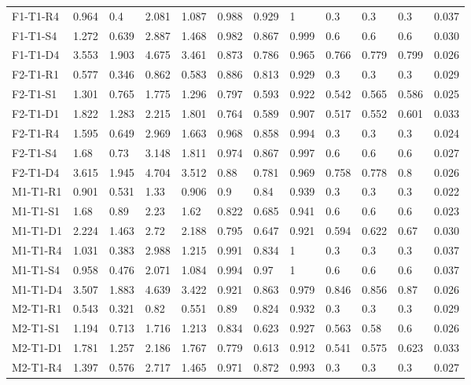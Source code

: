 \begin{table}[ht]
\begin{tabular}{llllllllllll}
  F1-T1-R4 & 0.964 & 0.4 & 2.081 & 1.087 & 0.988 & 0.929 & 1 & 0.3 & 0.3 & 0.3 &    0.037  \\ 
  F1-T1-S4 & 1.272 & 0.639 & 2.887 & 1.468 & 0.982 & 0.867 & 0.999 & 0.6 & 0.6 & 0.6 &    0.030  \\ 
  F1-T1-D4 & 3.553 & 1.903 & 4.675 & 3.461 & 0.873 & 0.786 & 0.965 & 0.766 & 0.779 & 0.799 &    0.026  \\ 
  F2-T1-R1 & 0.577 & 0.346 & 0.862 & 0.583 & 0.886 & 0.813 & 0.929 & 0.3 & 0.3 & 0.3 &    0.029  \\ 
  F2-T1-S1 & 1.301 & 0.765 & 1.775 & 1.296 & 0.797 & 0.593 & 0.922 & 0.542 & 0.565 & 0.586 &    0.025  \\ 
  F2-T1-D1 & 1.822 & 1.283 & 2.215 & 1.801 & 0.764 & 0.589 & 0.907 & 0.517 & 0.552 & 0.601 &    0.033  \\ 
  F2-T1-R4 & 1.595 & 0.649 & 2.969 & 1.663 & 0.968 & 0.858 & 0.994 & 0.3 & 0.3 & 0.3 &    0.024  \\ 
  F2-T1-S4 & 1.68 & 0.73 & 3.148 & 1.811 & 0.974 & 0.867 & 0.997 & 0.6 & 0.6 & 0.6 &    0.027  \\ 
  F2-T1-D4 & 3.615 & 1.945 & 4.704 & 3.512 & 0.88 & 0.781 & 0.969 & 0.758 & 0.778 & 0.8 &    0.026  \\ 
  M1-T1-R1 & 0.901 & 0.531 & 1.33 & 0.906 & 0.9 & 0.84 & 0.939 & 0.3 & 0.3 & 0.3 &    0.022  \\ 
  M1-T1-S1 & 1.68 & 0.89 & 2.23 & 1.62 & 0.822 & 0.685 & 0.941 & 0.6 & 0.6 & 0.6 &    0.023  \\ 
  M1-T1-D1 & 2.224 & 1.463 & 2.72 & 2.188 & 0.795 & 0.647 & 0.921 & 0.594 & 0.622 & 0.67 &    0.030  \\ 
  M1-T1-R4 & 1.031 & 0.383 & 2.988 & 1.215 & 0.991 & 0.834 & 1 & 0.3 & 0.3 & 0.3 &    0.037  \\ 
  M1-T1-S4 & 0.958 & 0.476 & 2.071 & 1.084 & 0.994 & 0.97 & 1 & 0.6 & 0.6 & 0.6 &    0.037  \\ 
  M1-T1-D4 & 3.507 & 1.883 & 4.639 & 3.422 & 0.921 & 0.863 & 0.979 & 0.846 & 0.856 & 0.87 &    0.026  \\ 
  M2-T1-R1 & 0.543 & 0.321 & 0.82 & 0.551 & 0.89 & 0.824 & 0.932 & 0.3 & 0.3 & 0.3 &    0.029  \\ 
  M2-T1-S1 & 1.194 & 0.713 & 1.716 & 1.213 & 0.834 & 0.623 & 0.927 & 0.563 & 0.58 & 0.6 &    0.026  \\ 
  M2-T1-D1 & 1.781 & 1.257 & 2.186 & 1.767 & 0.779 & 0.613 & 0.912 & 0.541 & 0.575 & 0.623 &    0.033  \\ 
  M2-T1-R4 & 1.397 & 0.576 & 2.717 & 1.465 & 0.971 & 0.872 & 0.993 & 0.3 & 0.3 & 0.3 &    0.027  \\ 

\end{tabular}
\end{table}
